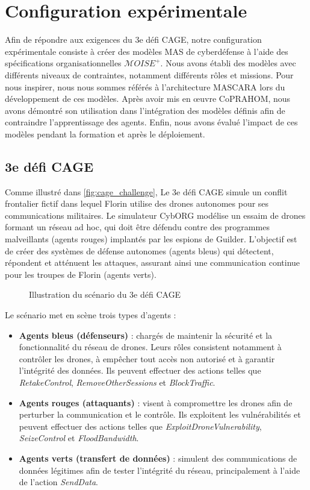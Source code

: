 \section{Configuration expérimentale}\label{sec:experimental_setup}

Afin de répondre aux exigences du 3e défi CAGE, notre configuration expérimentale consiste à créer des modèles MAS de cyberdéfense à l'aide des spécifications organisationnelles $\mathcal{M}OISE^+$. Nous avons établi des modèles avec différents niveaux de contraintes, notamment différents rôles et missions. Pour nous inspirer, nous nous sommes référés à l'architecture MASCARA lors du développement de ces modèles. Après avoir mis en œuvre CoPRAHOM, nous avons démontré son utilisation dans l'intégration des modèles définis afin de contraindre l'apprentissage des agents. Enfin, nous avons évalué l'impact de ces modèles pendant la formation et après le déploiement.

\subsection{3e défi CAGE}

Comme illustré dans \autoref{fig:cage_challenge},
Le 3e défi CAGE simule un conflit frontalier fictif dans lequel Florin utilise des drones autonomes pour ses communications militaires. Le simulateur CybORG modélise un essaim de drones formant un réseau ad hoc, qui doit être défendu contre des programmes malveillants (agents rouges) implantés par les espions de Guilder. L'objectif est de créer des systèmes de défense autonomes (agents bleus) qui détectent, répondent et atténuent les attaques, assurant ainsi une communication continue pour les troupes de Florin (agents verts).

\begin{figure}
  \centering
  
  \caption{Illustration du scénario du 3e défi CAGE}\label{fig:cage_challenge}
\end{figure}

Le scénario met en scène trois types d'agents :
\begin{itemize}
  \item \textbf{Agents bleus (défenseurs)} : chargés de maintenir la sécurité et la fonctionnalité du réseau de drones. Leurs rôles consistent notamment à contrôler les drones, à empêcher tout accès non autorisé et à garantir l'intégrité des données. Ils peuvent effectuer des actions telles que \textit{RetakeControl}, \textit{RemoveOtherSessions} et \textit{BlockTraffic}.
  \item \textbf{Agents rouges (attaquants)} : visent à compromettre les drones afin de perturber la communication et le contrôle. Ils exploitent les vulnérabilités et peuvent effectuer des actions telles que \textit{ExploitDroneVulnerability}, \textit{SeizeControl} et \textit{FloodBandwidth}.
  \item \textbf{Agents verts (transfert de données)} : simulent des communications de données légitimes afin de tester l'intégrité du réseau, principalement à l'aide de l'action \textit{SendData}.
\end{itemize}

